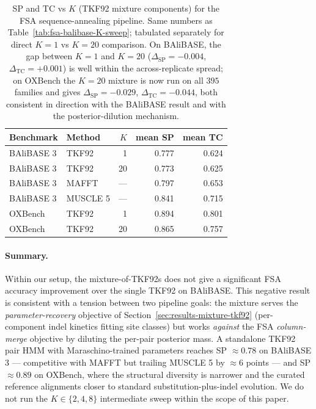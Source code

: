 \begin{table}[ht]
\centering\small
\begin{tabular}{llrrr}
\toprule
Benchmark & Method & $K$ & mean SP & mean TC \\
\midrule
BAliBASE 3 & TKF92    & 1   & 0.777 & 0.624 \\
BAliBASE 3 & TKF92    & 20  & 0.773 & 0.625 \\
BAliBASE 3 & MAFFT    & --- & 0.797 & 0.653 \\
BAliBASE 3 & MUSCLE 5 & --- & 0.841 & 0.715 \\
OXBench    & TKF92    & 1   & 0.894 & 0.801 \\
OXBench    & TKF92    & 20  & 0.865 & 0.757 \\
\bottomrule
\end{tabular}
\caption{SP and TC vs $K$ (TKF92 mixture components) for the FSA
sequence-annealing pipeline.  Same numbers as
Table~\ref{tab:fsa-balibase-K-sweep}; tabulated separately for
direct $K = 1$ vs $K = 20$ comparison.  On BAliBASE, the gap
between $K = 1$ and $K = 20$ ($\Delta_{\text{SP}} = -0.004$,
$\Delta_{\text{TC}} = +0.001$) is well within the across-replicate
spread; on OXBench the $K = 20$ mixture is now run on all $395$
families and gives $\Delta_{\text{SP}} = -0.029$,
$\Delta_{\text{TC}} = -0.044$, both consistent in direction with
the BAliBASE result and with the posterior-dilution mechanism.}
\label{tab:fsa-sp-tc-vs-K}
\end{table}

\paragraph{Summary.}
Within our setup, the mixture-of-TKF92s does not give a
significant FSA accuracy improvement over the single TKF92 on
BAliBASE.  This negative result is consistent with a tension
between two pipeline goals: the mixture serves the
\emph{parameter-recovery} objective of
Section~\ref{sec:results-mixture-tkf92} (per-component indel
kinetics fitting site classes) but works \emph{against} the FSA
\emph{column-merge} objective by diluting the per-pair posterior
mass.  A standalone TKF92 pair HMM with Maraschino-trained
parameters reaches SP $\approx 0.78$ on BAliBASE 3 --- competitive
with MAFFT but trailing MUSCLE 5 by $\approx 6$ points --- and
SP $\approx 0.89$ on OXBench, where the structural diversity is
narrower and the curated reference alignments closer to standard
substitution-plus-indel evolution.  We do not run the
$K \in \{2, 4, 8\}$ intermediate sweep within the scope of this
paper.

